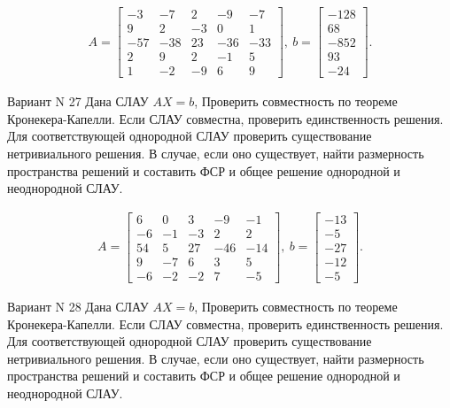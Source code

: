 \documentclass[11pt]{report}
\begin{document}
\begin{align*}
 A = \left[\begin{matrix}-3 & -7 & 2 & -9 & -7\\9 & 2 & -3 & 0 & 1\\-57 & -38 & 23 & -36 & -33\\2 & 9 & 2 & -1 & 5\\1 & -2 & -9 & 6 & 9\end{matrix}\right],
\ b = \left[\begin{matrix}-128\\68\\-852\\93\\-24\end{matrix}\right]. 
 \end{align*}

Вариант N 27
Дана СЛАУ $AX = b$,
Проверить совместность по теореме Кронекера-Капелли. Если СЛАУ совместна, проверить единственность решения.
Для соответствующей однородной СЛАУ проверить существование нетривиального решения. В случае, если оно существует,
найти размерность пространства решений и составить ФСР и общее решение однородной  и неоднородной СЛАУ.


\begin{align*}
 A = \left[\begin{matrix}6 & 0 & 3 & -9 & -1\\-6 & -1 & -3 & 2 & 2\\54 & 5 & 27 & -46 & -14\\9 & -7 & 6 & 3 & 5\\-6 & -2 & -2 & 7 & -5\end{matrix}\right],
\ b = \left[\begin{matrix}-13\\-5\\-27\\-12\\-5\end{matrix}\right]. 
 \end{align*}

Вариант N 28
Дана СЛАУ $AX = b$,
Проверить совместность по теореме Кронекера-Капелли. Если СЛАУ совместна, проверить единственность решения.
Для соответствующей однородной СЛАУ проверить существование нетривиального решения. В случае, если оно существует,
найти размерность пространства решений и составить ФСР и общее решение однородной  и неоднородной СЛАУ.
\end{document}
